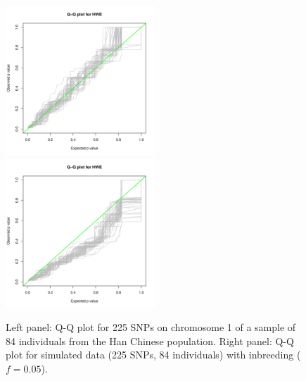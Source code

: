 \documentclass[nojss]{jss}
\begin{document}
\begin{figure}[t!]
\centering
\includegraphics[width=0.5\textwidth, trim=0 10 0 20, clip]{HWHapMapQQplot.pdf}%
\includegraphics[width=0.5\textwidth, trim=0 10 0 20, clip]{HWHapMapQQplotInbred.pdf}
\caption{Left panel: Q-Q plot for 225 SNPs on chromosome 1 of a sample
  of 84 individuals from the Han Chinese population. Right panel: Q-Q
  plot for simulated data (225 SNPs, 84 individuals) with inbreeding
  ($f=0.05$).}\label{fig:qqplot}
\end{figure}
\end{document}
